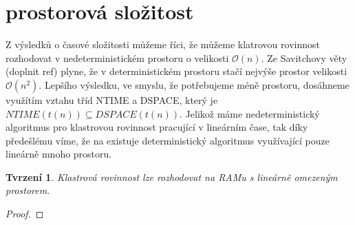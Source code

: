 \documentclass[12pt,a4report]{report}
\newtheorem{tvr4}{Tvrzení}
\begin{document}
\section{prostorová složitost}
Z výsledků o časové složitosti můžeme říci, že můžeme klatrovou rovinnost rozhodovat v nedeterministickém prostoru o velikosti $\mathcal{O}(n)$. Ze Savitchovy věty (doplnit ref) plyne, že v deterministickém prostoru stačí nejvýše prostor velikosti $\mathcal{O}(n^2)$.
Lepšího výsledku, ve smyslu, že potřebujeme méně prostoru, dosáhneme využítím vztahu tříd NTIME a DSPACE, který je $NTIME(t(n)) \subseteq DSPACE(t(n))$. Jelikož máme nedeterministický algoritmus pro klastrovou rovinnost pracující v lineárním čase, tak díky předešlému víme, že na existuje deterministický algoritmus využívající pouze lineárně mnoho prostoru.
\begin{tvr4}
Klastrová rovinnost lze rozhodovat na RAMu s lineárně omezeným prostorem.
\end{tvr4}
\begin{proof}
\end{proof}
\end{document}
